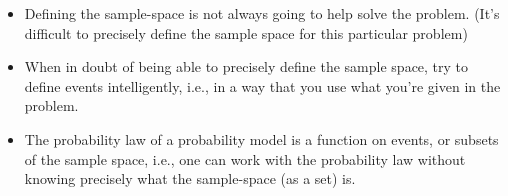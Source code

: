 \documentclass[6008notes.tex]{subfiles}
\begin{document}
\begin{itemize}
\item Defining the sample-space is not always going to help solve the problem. (It's difficult to precisely define the sample space for this particular problem)

\item When in doubt of being able to precisely define the sample space, try to define events intelligently, i.e., in a way that you use what you're given in the problem.

\item The probability law of a probability model is a function on events, or subsets of the sample space, i.e., one can work with the probability law without knowing precisely what the sample-space (as a set) is.
\end{itemize}
\end{document}
